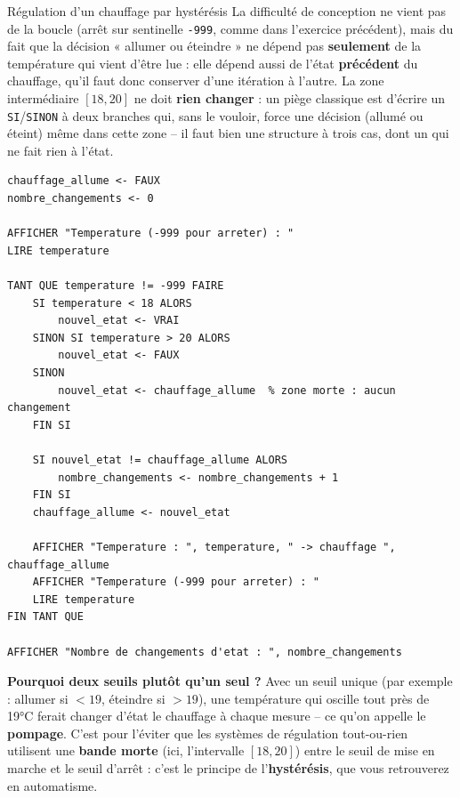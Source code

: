 \begin{UPSTIprofOnlyEnv}
    \begin{UPSTIcorrectionP}{Régulation d'un chauffage par hystérésis}
        La difficulté de conception ne vient pas de la boucle (arrêt sur sentinelle \texttt{-999}, comme dans l'exercice précédent), mais du fait que la décision « allumer ou éteindre » ne dépend pas \textbf{seulement} de la température qui vient d'être lue : elle dépend aussi de l'état \textbf{précédent} du chauffage, qu'il faut donc conserver d'une itération à l'autre. La zone intermédiaire \([18, 20]\) ne doit \textbf{rien changer} : un piège classique est d'écrire un \texttt{SI}/\texttt{SINON} à deux branches qui, sans le vouloir, force une décision (allumé ou éteint) même dans cette zone -- il faut bien une structure à trois cas, dont un qui ne fait rien à l'état.

        \begin{verbatim}
chauffage_allume <- FAUX
nombre_changements <- 0

AFFICHER "Temperature (-999 pour arreter) : "
LIRE temperature

TANT QUE temperature != -999 FAIRE
    SI temperature < 18 ALORS
        nouvel_etat <- VRAI
    SINON SI temperature > 20 ALORS
        nouvel_etat <- FAUX
    SINON
        nouvel_etat <- chauffage_allume  % zone morte : aucun changement
    FIN SI

    SI nouvel_etat != chauffage_allume ALORS
        nombre_changements <- nombre_changements + 1
    FIN SI
    chauffage_allume <- nouvel_etat

    AFFICHER "Temperature : ", temperature, " -> chauffage ", chauffage_allume
    AFFICHER "Temperature (-999 pour arreter) : "
    LIRE temperature
FIN TANT QUE

AFFICHER "Nombre de changements d'etat : ", nombre_changements
        \end{verbatim}

        \textbf{Pourquoi deux seuils plutôt qu'un seul ?} Avec un seuil unique (par exemple : allumer si $< 19$, éteindre si $> 19$), une température qui oscille tout près de 19°C ferait changer d'état le chauffage à chaque mesure -- ce qu'on appelle le \textbf{pompage}. C'est pour l'éviter que les systèmes de régulation tout-ou-rien utilisent une \textbf{bande morte} (ici, l'intervalle \([18, 20]\)) entre le seuil de mise en marche et le seuil d'arrêt : c'est le principe de l'\textbf{hystérésis}, que vous retrouverez en automatisme.
    \end{UPSTIcorrectionP}
\end{UPSTIprofOnlyEnv}
